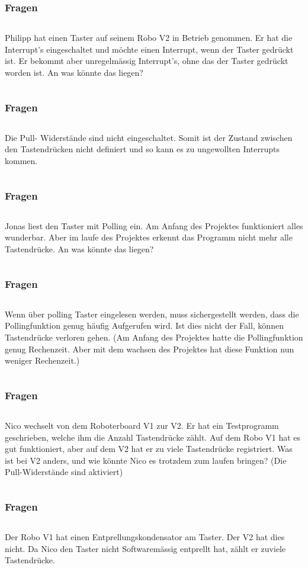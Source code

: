 
\begin{frame}
  \frametitle{Fragen}
	    \begin{column}{1\linewidth}
		Philipp hat einen Taster auf seinem Robo V2 in Betrieb genommen. Er hat die Interrupt’s eingeschaltet und möchte einen Interrupt, wenn der Taster gedrückt ist. Er bekommt aber unregelmässig Interrupt's, ohne das der Taster gedrückt worden ist. An was könnte das liegen?
	    \end{column}
\end{frame}

\begin{frame}
	\frametitle{Fragen}
	\begin{column}{1\linewidth}
		Die Pull- Widerstände sind nicht eingeschaltet. Somit ist der Zustand zwischen den Tastendrücken nicht definiert und so kann es zu ungewollten Interrupts kommen. 
	\end{column}
\end{frame}

\begin{frame}
	\frametitle{Fragen}
	\begin{column}{1\linewidth}
		Jonas liest den Taster mit Polling ein. Am Anfang des Projektes funktioniert alles wunderbar. Aber im laufe des Projektes erkennt das Programm nicht mehr alle Tastendrücke. An was könnte das liegen?
	\end{column}
\end{frame}

\begin{frame}
	\frametitle{Fragen}
	\begin{column}{1\linewidth}
		Wenn über polling Taster eingelesen werden, muss sichergestellt werden, dass die Pollingfunktion genug häufig Aufgerufen wird. Ist dies nicht der Fall, können Tastendrücke verloren gehen. (Am Anfang des Projektes hatte die Pollingfunktion genug Rechenzeit. Aber mit dem wachsen des Projektes hat diese Funktion nun weniger Rechenzeit.)
	\end{column}
\end{frame}

\begin{frame}
	\frametitle{Fragen}
	\begin{column}{1\linewidth}
	Nico wechselt von dem Roboterboard V1 zur V2. Er hat ein Testprogramm geschrieben, welche ihm die Anzahl Tastendrücke zählt. Auf dem Robo V1 hat es gut funktioniert, aber auf dem V2 hat er zu viele Tastendrücke registriert. Was ist bei V2 anders, und wie könnte Nico es trotzdem zum laufen bringen? (Die Pull-Widerstände sind aktiviert)
	\end{column}
\end{frame}

\begin{frame}
	\frametitle{Fragen}
	\begin{column}{1\linewidth}
		Der Robo V1 hat einen Entprellungskondensator am Taster. Der V2 hat dies nicht. Da Nico den Taster nicht Softwaremässig entprellt hat, zählt er zuviele Tastendrücke.
	\end{column}
\end{frame}